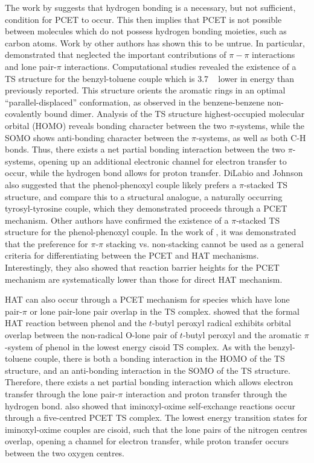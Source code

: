 The work by \citet{Mayer2002} suggests that hydrogen bonding is a necessary, but not sufficient, condition for PCET to occur. This then implies that PCET is not possible between molecules which do not possess hydrogen bonding moieties, such as carbon atoms. Work by other authors has shown this to be untrue.\cite{Hatcher2007, DiLabio2007} In particular, \citet{DiLabio2007} demonstrated that \citet{Mayer2002} neglected the important contributions of $\pi-\pi$ interactions and lone pair-$\pi$ interactions. Computational studies revealed the existence of a TS structure for the benzyl-toluene couple which is 3.7 \kcalmol~ lower in energy than previously reported. This structure orients the aromatic rings in an optimal ``parallel-displaced'' conformation, as observed in the benzene-benzene non-covalently bound dimer.\cite{Sinnokrot2002}
Analysis of the TS structure highest-occupied molecular orbital (HOMO) reveals bonding character between the two $\pi$-systems, while the SOMO shows anti-bonding character between the $\pi$-systems, as well as both C-H bonds. Thus, there exists a net partial bonding interaction between the two $\pi$-systems, opening up an additional electronic channel for electron transfer to occur, while the hydrogen bond allows for proton transfer. DiLabio and Johnson also suggested that the phenol-phenoxyl couple likely prefers a $\pi$-stacked TS structure, and compare this to a structural analogue, a naturally occurring tyrosyl-tyrosine couple, which they demonstrated proceeds through a PCET mechanism. Other authors have confirmed the existence of a $\pi$-stacked TS structure for the phenol-phenoxyl couple.\cite{Sirjoosingh2011, HammesSchiffer2015, MunozRugeles2017} In the work of \citet{MunozRugeles2017}, it was demonstrated that the preference for $\pi$-$\pi$ stacking vs. non-stacking cannot be used as a general criteria for differentiating between the PCET and HAT mechanisms. Interestingly, they also showed that reaction barrier heights for the PCET mechanism are systematically lower than those for direct HAT mechanism.

HAT can also occur through a PCET mechanism for species which have lone pair-$\pi$ or lone pair-lone pair overlap in the TS complex.\cite{DiLabio2007, DiLabio2005} \citet{DiLabio2007} showed that the formal HAT reaction between phenol and the $t$-butyl peroxyl radical exhibits orbital overlap between the non-radical O-lone pair of $t$-butyl peroxyl and the aromatic $\pi$-system of phenol in the lowest energy cisoid TS complex. As with the benzyl-toluene couple, there is both a bonding interaction in the HOMO of the TS structure, and an anti-bonding interaction in the SOMO of the TS structure. Therefore, there exists a net partial bonding interaction which allows electron transfer through the lone pair-$\pi$ interaction and proton transfer through the hydrogen bond. \citet{DiLabio2005} also showed that iminoxyl-oxime self-exchange reactions occur through a five-centred PCET TS complex. The lowest energy transition states for iminoxyl-oxime couples are cisoid, such that the lone pairs of the nitrogen centres overlap, opening a channel for electron transfer, while proton transfer occurs between the two oxygen centres.

